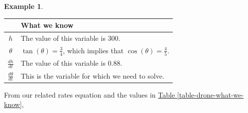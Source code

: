 \documentclass[12pt,]{book}
\theoremstyle{plain}
\theoremstyle{definition}
\newtheorem{example}[theorem]{Example}
\numberwithin{equation}{section}
\newcounter{figstack}
\newcounter{figindex}
\newlength\fight
\newcommand\pushValignCaptionBottom[5][b]{%
\stepcounter{figstack}%
\expandafter\def\csname %
figalign\romannumeral\value{figstack}\endcsname{#1}%
\expandafter\def\csname %
figtype\romannumeral\value{figstack}\endcsname{#2}%
\expandafter\def\csname %
figwd\romannumeral\value{figstack}\endcsname{#3}%
\expandafter\def\csname %
figcontent\romannumeral\value{figstack}\endcsname{#4}%
\expandafter\def\csname %
figcap\romannumeral\value{figstack}\endcsname{#5}%
\setbox0=\hbox{%
\begin{#2}{#3}#4\end{#2}}%
\ifdim\dimexpr\ht0+\dp0\relax>\fight\global\setlength{\fight}{%
\dimexpr\ht0+\dp0\relax}\fi%
}
\newcommand\popValignCaptionBottom{%
\setcounter{figindex}{0}%
\hfill%
\whiledo{\value{figindex}<\value{figstack}}{%
\stepcounter{figindex}%
\def\tmp{\csname figwd\romannumeral\value{figindex}\endcsname}%
\begin{\csname figtype\romannumeral\value{figindex}\endcsname}[t]{\tmp}%
\centering%
\stackinset{c}{}%
{\csname figalign\romannumeral\value{figindex}\endcsname}{}%
{\csname figcontent\romannumeral\value{figindex}\endcsname}%
{\rule{0pt}{\fight}}\par%
\csname figcap\romannumeral\value{figindex}\endcsname%
\end{\csname figtype\romannumeral\value{figindex}\endcsname}%
\hfill%
}%
\setcounter{figstack}{0}%
\setlength{\fight}{0pt}%
\hfill%
}
\newcommand{\fe}[2]{#1\mathopen{}\left(#2\right)\mathclose{}}
\newcommand{\lz}[2]{\frac{d#1}{d#2}}
\newcommand{\lzoo}[2]{{\frac{d}{d#1}}{\left(#2\right)}}
\begin{document}
\begin{example}
\begin{table}
\begin{tabular}{cp{3.5in}c}
\bottomrule
\end{tabular}
\end{table}
\begin{figure}
\centering
\pushValignCaptionBottom[b]{minipage}{.50\textwidth}{%
\pgfplotsset{every axis/.append style={width=0.9\linewidth}}%
\centering%
{
\begin{tikzpicture}
\coordinate (O) at (0,0);
\coordinate (A) at (4,0);
\coordinate (B) at (4,2);
\draw (O)--(A)--(B)--cycle;
\tkzLabelSegment[below=2pt](O,A){$400$}
\tkzLabelSegment[right=2pt](A,B){$h$}
\tkzMarkAngle(A,O,B)
\tkzLabelAngle[pos = 0.8](A,O,B){$\theta$}
\end{tikzpicture}
}
}%
{\captionof{figure}{Variable Diagram\label{figure-85}}
}%
\pushValignCaptionBottom[b]{minipage}{.50\textwidth}{%
\pgfplotsset{every axis/.append style={width=0.9\linewidth}}%
\parbox{\textwidth}{%
\setlength{\parskip}{0.5pc}%
\begin{align*}
\fe{\tan}{\theta}&=\frac{h}{400}\\
\lzoo{t}{\fe{\tan}{\theta}}&=\lzoo{t}{\frac{h}{400}}\\
\fe{\sec^2}{\theta}\lz{\theta}{t}&=\frac{1}{400}\lz{h}{t}
\end{align*}This is our related rates equation.%
}%
}%
{}%
\popValignCaptionBottom
\end{figure}
\par
At the moment the drone is \SI{300}{\foot} above the ground and rising at a rate of \SI{0.88}{\foot\per\second}.%
\begin{table}
\centering
\caption{What we know about the variables at the described moment\label{table-drone-what-we-know}}
\begin{tabular}{cp{4in}}
\toprule
Variable&What we know\\
\midrule
\(h\)&The value of this variable is \(300\).\\
\midrule
\(\theta\)&\(\fe{\tan}{\theta}=\frac{3}{4}\), which implies that \(\fe{\cos}{\theta}=\frac{4}{5}\).\\
\midrule
\(\lz{h}{t}\)&The value of this variable is \(0.88\).\\
\midrule
\(\lz{\theta}{t}\)&This is the variable for which we need to solve.\\
\bottomrule
\end{tabular}
\end{table}
\par
From our related rates equation and the values in \hyperref[table-drone-what-we-know]{Table \ref{table-drone-what-we-know}},%

\end{example}
\end{document}

